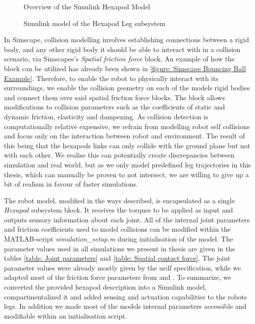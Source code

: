 \begin{figure}[h]
	\centerline{}
	\caption[Simulink hexapod model overview]{Overview of the Simulink Hexapod Model}
	\label{figure: Hexapod Model Overview}
\end{figure}

\begin{figure}
	\centerline{}
	\caption[Simulink leg subsystem]{Simulink model of the Hexapod Leg subsystem}
	\label{figure: Hexapod Leg}
\end{figure}

In Simscape, collision modelling involves establishing connections between a rigid body, and any other rigid body it should be able to interact with in a collision scenario, via Simscapes's \textit{Spatial friction force} block.
An example of how the block can be utilized has already been shown in \ref{figure: Simscape Bouncing Ball Example}.
Therefore, to enable the robot to physically interact with its surroundings, we enable the collision geometry on each of the models rigid bodies and connect them over said spatial friction force blocks.
The block allows modifications to collision parameters such as the coefficients of static and dynamic friction, elasticity and dampening.
As collision detection is computationally relative expensive, we refrain from modelling robot self collisions and focus only on the interaction between robot and environment.
The result of this being that the hexapods links can only collide with the ground plane but not with each other.
We realise this can potentially create discrepancies between simulation and real world, but as we only model predefined leg trajectories in this thesis, which can manually be proven to not intersect, we are willing to give up a bit of realism in favour of faster simulations.

The robot model, modified in the ways described, is encapsulated as a single \textit{Hexapod} subsystem block.
It receives the torques to be applied as input and outputs sensory information about each joint.
All of the internal joint parameters and friction coefficients used to model collisions can be modified within the MATLAB-script \textit{simulation\_setup.m} during initialisation of the model.
The parameter values used in all simulations we present in thesis are given in the tables \ref{table: Joint parameters} and \ref{table: Spatial contact force}.
The joint parameter values were already mostly given by the urdf specification, while we adapted most of the friction force parameters from \parencite{trotta2022walking} and \parencite{AUTHOR2}.
To summarize, we converted the provided hexapod description into a Simulink model, compartmentalized it and added sensing and actuation capabilities to the robots legs.
In addition we made most of the models internal parameters accessible and modifiable within an initialisation script.



